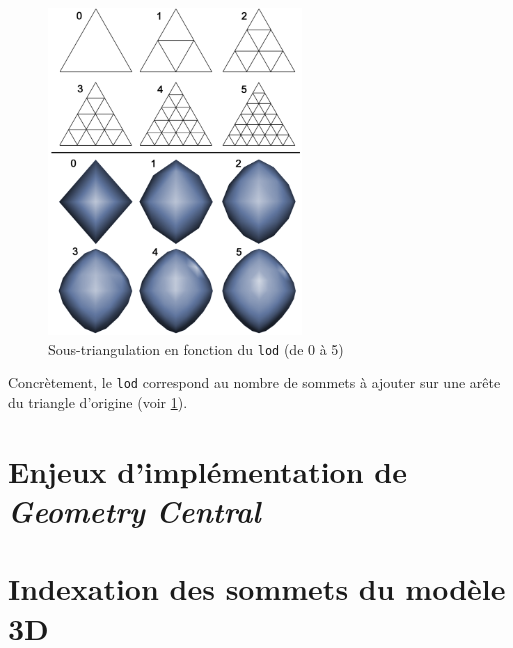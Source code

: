 \documentclass{article}
\begin{document}
\begin{figure}[ht!]
\centering
    \includegraphics[width=0.6\textwidth]{lod}
    \caption{Sous-triangulation en fonction du \texttt{lod} (de 0 à 5)}
    \label{fig:lod}
\end{figure}

Concrètement, le \texttt{lod} correspond au nombre de sommets à ajouter sur une
arête du triangle d'origine (voir \ref{fig:lod}).



\section{Enjeux d'implémentation de \textit{Geometry Central}}

\section{Indexation des sommets du modèle 3D}
\end{document}
